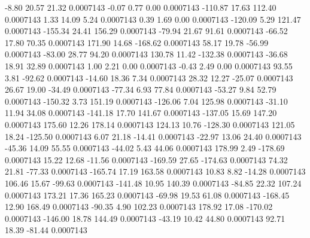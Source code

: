        -8.80       20.57       21.32     0.0007143
       -0.07        0.77        0.00     0.0007143
     -110.87       17.63      112.40     0.0007143
        1.33       14.09        5.24     0.0007143
        0.39        1.69        0.00     0.0007143
     -120.09        5.29      121.47     0.0007143
     -155.34       24.41      156.29     0.0007143
      -79.94       21.67       91.61     0.0007143
      -66.52       17.80       70.35     0.0007143
      171.90       14.68     -168.62     0.0007143
       58.17       19.78      -56.99     0.0007143
      -83.00       28.77       94.20     0.0007143
      130.78       11.42     -132.38     0.0007143
      -36.68       18.91       32.89     0.0007143
        1.00        2.21        0.00     0.0007143
       -0.43        2.49        0.00     0.0007143
       93.55        3.81      -92.62     0.0007143
      -14.60       18.36        7.34     0.0007143
       28.32       12.27      -25.07     0.0007143
       26.67       19.00      -34.49     0.0007143
      -77.34        6.93       77.84     0.0007143
      -53.27        9.84       52.79     0.0007143
     -150.32        3.73      151.19     0.0007143
     -126.06        7.04      125.98     0.0007143
      -31.10       11.94       34.08     0.0007143
     -141.18       17.70      141.67     0.0007143
     -137.05       15.69      147.20     0.0007143
      175.60       12.26      178.14     0.0007143
      124.13       10.76     -128.30     0.0007143
      121.05       18.24     -125.50     0.0007143
        6.07       21.18      -14.41     0.0007143
      -22.97       13.06       24.40     0.0007143
      -45.36       14.09       55.55     0.0007143
      -44.02        5.43       44.06     0.0007143
      178.99        2.49     -178.69     0.0007143
       15.22       12.68      -11.56     0.0007143
     -169.59       27.65     -174.63     0.0007143
       74.32       21.81      -77.33     0.0007143
     -165.74       17.19      163.58     0.0007143
       10.83        8.82      -14.28     0.0007143
      106.46       15.67      -99.63     0.0007143
     -141.48       10.95      140.39     0.0007143
      -84.85       22.32      107.24     0.0007143
      173.21       17.36      165.23     0.0007143
      -69.98       19.53       61.08     0.0007143
     -168.45       12.90      168.49     0.0007143
      -90.35        4.90      102.23     0.0007143
      178.92       17.08     -170.02     0.0007143
     -146.00       18.78      144.49     0.0007143
      -43.19       10.42       44.80     0.0007143
       92.71       18.39      -81.44     0.0007143
